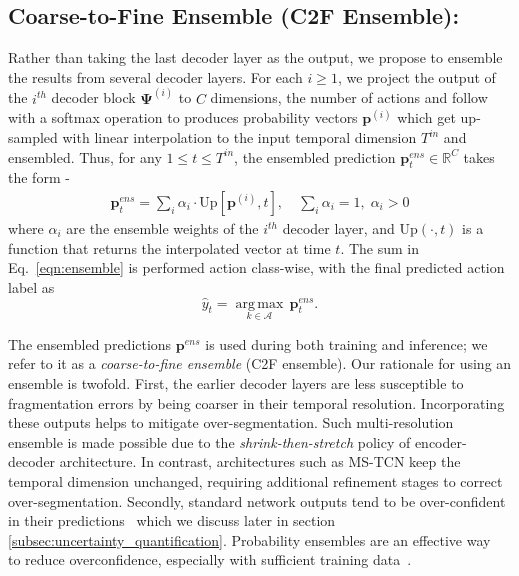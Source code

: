 \documentclass[10pt,twocolumn,letterpaper]{article}
\DeclareMathOperator{\argmax}{\arg\,\max}
\newcommand{\calA}{\mathcal{A}}
\newcommand{\bbR}{\mathbb{R}}
\newcommand{\bp}{\mathbf{p}}
\newcommand{\dec}{\ensuremath{\mathbf{\Psi}}}
\newcommand{\BK}[1]{ {\left( #1 \right)} }
\newcommand{\sqBK}[1]{ {\left[ #1 \right]} }
\begin{document}
\subsection{Coarse-to-Fine Ensemble (C2F Ensemble):}\label{subsec:multilayer_ensemble}
Rather than taking the last decoder layer as the output, we propose to ensemble the results from several decoder layers. For each $i\!\ge\!1$, we project the output of the $i^{th}$ decoder block $\dec^{(i)}$ to 
$C$ dimensions, \ie the number of actions and follow with a 
softmax operation to produces probability vectors $\bp^{(i)}$ which 
get up-sampled with linear interpolation to the input temporal dimension $T^{in}$ and ensembled. Thus, for any $1\!\le\!t\!\le T^{in}$, the ensembled
prediction ${\bp}^{ens}_t \in \bbR^{C}$ takes the form -
\begin{gather}\label{eqn:ensemble}
    {\bp}^{ens}_t = \sum_{i} \alpha_i \cdot \text{Up}\sqBK{\bp^{(i)}, t}, \quad \sum_i \alpha_i = 1, \; \alpha_i > 0
\end{gather}
where $\alpha_i$ are the ensemble weights of the $i^{th}$ decoder layer, and $\text{Up}\BK{\cdot, t}$ is a function that returns the interpolated vector at time $t$. The sum in Eq.~\ref{eqn:ensemble} is performed action class-wise, with the final predicted action label as
\begin{equation}
 \hat{y}_t = \underset{k \in \calA}{\argmax} \, {\bp}^{ens}_t.
 \end{equation}

The ensembled predictions ${\bp}^{ens}$ is used during both training and inference; we refer to it as a \textit{coarse-to-fine ensemble} (C2F ensemble). Our rationale for using an ensemble is twofold. First, the earlier decoder layers are less susceptible to fragmentation errors by being coarser in their temporal resolution. Incorporating these outputs helps to mitigate over-segmentation. Such multi-resolution ensemble is made possible due to the \textit{shrink-then-stretch} policy of encoder-decoder architecture. In contrast, architectures such as MS-TCN keep the temporal dimension unchanged, requiring additional refinement stages to correct over-segmentation. 
Secondly, standard network outputs tend to be over-confident in their predictions~\cite{Guo_calibration_2017} which we discuss later in section \ref{subsec:uncertainty_quantification}.  Probability ensembles are an effective way~\cite{DeepEnsemble, lee2015m} to reduce overconfidence, especially with sufficient training data~\cite{rahaman2020uncertainty}. 
\end{document}

